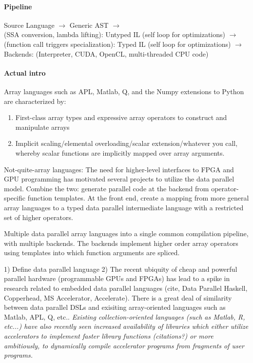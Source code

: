 \documentclass[preprint]{sigplanconf}
\begin{document}
\paragraph*{Pipeline} 
Source Language $\rightarrow $ Generic AST $ \rightarrow $ \\ 
(SSA conversion, lambda lifting): Untyped IL (self loop for optimizations) $\rightarrow$ \\
(function call triggers specialization): Typed IL (self loop for optimizations) $\rightarrow$\\
Backends: (Interpreter, CUDA, OpenCL, multi-threaded CPU code)

\paragraph*{Actual intro}
Array languages such as APL, Matlab, Q, and the Numpy extensions to Python are characterized by: 
\begin{enumerate}
 \item First-class array types and expressive array operators to construct and manipulate arrays
 \item Implicit scaling/elemental overloading/scalar extension/whatever you call, whereby scalar functions are implicitly mapped over array arguments.
\end{enumerate}
Not-quite-array languages: The need for higher-level interfaces to FPGA and GPU programming has motivated several projects
to utilize the data parallel model.  
Combine the two: generate parallel code at the backend from operator-specific function templates. At the front end, create a mapping from more general 
array languages to a typed data parallel intermediate language with a restricted set of higher operators.

Multiple data parallel array languages into a single common compilation pipeline, with multiple backends. 
The backends implement higher order array operators using templates into which function arguments are spliced. 

1) Define data parallel language
2) The recent ubiquity of cheap and powerful parallel hardware (programmable GPUs and FPGAs) 
has lead to a spike in research related to embedded data parallel languages (cite, Data Parallel Haskell, Copperhead, MS Accelerator, Accelerate). 
There is a great deal of similarity between data parallel DSLs and exisiting array-oriented languages such as Matlab, APL, Q, etc.. 
\textit{Existing collection-oriented languages (such as Matlab, R, etc...) have also recently seen increased availability of libraries 
which either utilize accelerators to implement faster library functions (citations?) or more ambitiously, to dynamically compile 
accelerator programs from fragments of user programs.}
\end{document}
